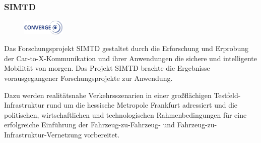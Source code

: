 \subsubsection{\acs{SIMTD}}
\begin{figure}
  \centering
  	 \includegraphics[width=0.18\textwidth]{./content/images/logos/logo-projekte/converge_logo.pdf}
\end{figure}
Das Forschungsprojekt \ac{SIMTD} gestaltet durch die Erforschung und Erprobung der Car-to-X-Kommunikation und ihrer Anwendungen die sichere und intelligente Mobilität von morgen. 
Das Projekt \ac{SIMTD} brachte die Ergebnisse vorausgegangener Forschungsprojekte zur Anwendung. 

Dazu werden realitätsnahe Verkehrsszenarien in einer großflächigen Testfeld-Infrastruktur rund um die hessische Metropole Frankfurt adressiert und die politischen, wirtschaftlichen und technologischen Rahmenbedingungen für eine erfolgreiche Einführung der Fahrzeug-zu-Fahrzeug- und Fahrzeug-zu-Infrastruktur-Vernetzung vorbereitet. \cite{simtd_info}



